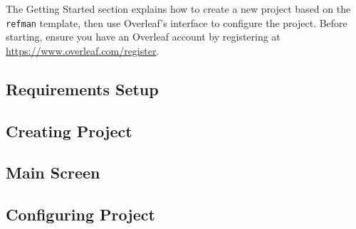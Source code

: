 The Getting Started section explains how to create a new project based on the \texttt{refman} template, then use Overleaf's interface to configure the project. Before starting, ensure you have an Overleaf account by registering at \url{https://www.overleaf.com/register}.

\begin{minipage}{\linewidth}
\end{minipage}

\subsection{Requirements Setup}


\subsection{Creating Project}

\subsection{Main Screen}

\subsection{Configuring Project}

